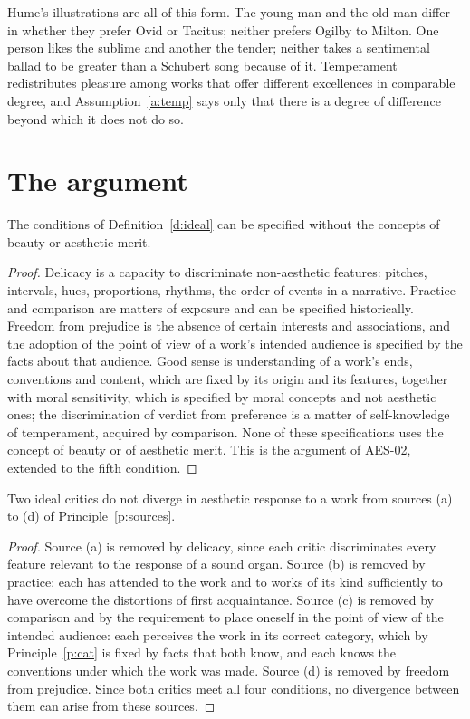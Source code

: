 \documentclass{situationist-preprint}
\begin{document}
Hume's illustrations are all of this form. The young man and the old man differ in whether they prefer Ovid or Tacitus; neither prefers Ogilby to Milton. One person likes the sublime and another the tender; neither takes a sentimental ballad to be greater than a Schubert song because of it. Temperament redistributes pleasure among works that offer different excellences in comparable degree, and Assumption~\ref{a:temp} says only that there is a degree of difference beyond which it does not do so.

\section{The argument}\label{s:arg}

\begin{lemma}\label{l:noncirc}
The conditions of Definition~\ref{d:ideal} can be specified without the concepts of beauty or aesthetic merit.
\end{lemma}

\begin{proof}
Delicacy is a capacity to discriminate non-aesthetic features: pitches, intervals, hues, proportions, rhythms, the order of events in a narrative. Practice and comparison are matters of exposure and can be specified historically. Freedom from prejudice is the absence of certain interests and associations, and the adoption of the point of view of a work's intended audience is specified by the facts about that audience. Good sense is understanding of a work's ends, conventions and content, which are fixed by its origin and its features, together with moral sensitivity, which is specified by moral concepts and not aesthetic ones; the discrimination of verdict from preference is a matter of self-knowledge of temperament, acquired by comparison. None of these specifications uses the concept of beauty or of aesthetic merit. This is the argument of AES-02, extended to the fifth condition.
\end{proof}

\begin{lemma}\label{l:elim}
Two ideal critics do not diverge in aesthetic response to a work from sources (a) to (d) of Principle~\ref{p:sources}.
\end{lemma}

\begin{proof}
Source (a) is removed by delicacy, since each critic discriminates every feature relevant to the response of a sound organ. Source (b) is removed by practice: each has attended to the work and to works of its kind sufficiently to have overcome the distortions of first acquaintance. Source (c) is removed by comparison and by the requirement to place oneself in the point of view of the intended audience: each perceives the work in its correct category, which by Principle~\ref{p:cat} is fixed by facts that both know, and each knows the conventions under which the work was made. Source (d) is removed by freedom from prejudice. Since both critics meet all four conditions, no divergence between them can arise from these sources.
\end{proof}
\end{document}
